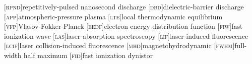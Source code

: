[\textsc{rpnd}]{repetitively-pulsed nanosecond discharge}
[\textsc{dbd}]{dielectric-barrier discharge}
[\textsc{app}]{atmospheric-pressure plasma}
[\textsc{lte}]{local thermodynamic equilibrium}
[\textsc{vfp}]{Vlasov-Fokker-Planck}
[\textsc{eedf}]{electron energy distribution function}
[\textsc{fiw}]{fast ionization wave}
[\textsc{las}]{laser-absorption spectroscopy}
[\textsc{lif}]{laser-induced fluorescence}
[\textsc{lcif}]{laser collision-induced fluorescence}
[\textsc{mhd}]{magnetohydrodynamic}
[\textsc{fwhm}]{full-width half maximum}
[\textsc{fid}]{fast ionization dynistor}
